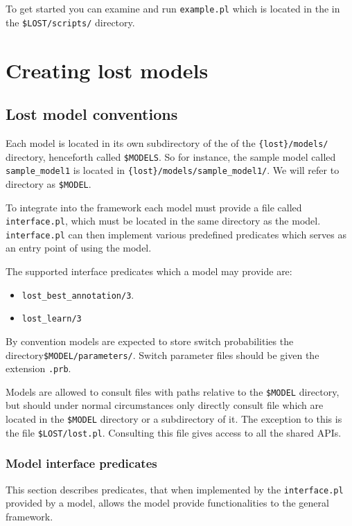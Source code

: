 \documentclass{book}
\begin{document}
To get started you can examine and run \texttt{example.pl} which 
is located in the in the \texttt{\$LOST/scripts/} directory.

\chapter{Creating lost models}

\section{Lost model conventions}\label{sec:lost_model_conventions}

Each model is located in its own subdirectory of the of the
\texttt{\{lost\}/models/} directory, henceforth called \texttt{\$MODELS}. 
So for instance, the sample model called \texttt{sample\_model1} is located in
\texttt{\{lost\}/models/sample\_model1/}. We will refer to directory 
as \texttt{\$MODEL}.

To integrate into the framework each model must provide a file called
\texttt{interface.pl}, which must be located in the same directory as
the model. \texttt{interface.pl} can then implement various predefined
predicates which serves as an entry point of using the
model. 

The supported interface predicates which a model may provide are:
\begin{itemize}
\item \texttt{lost\_best\_annotation/3}.
\item \texttt{lost\_learn/3}
\end{itemize}

By convention models are expected to store switch probabilities the
directory\texttt{\$MODEL/parameters/}. Switch parameter files should
be given the extension \texttt{.prb}.

Models are allowed to consult files with paths relative to the
\texttt{\$MODEL} directory, but should under normal circumstances
only directly consult file which are located in the 
\texttt{\$MODEL} directory or a subdirectory of it.
The exception to this is the file \texttt{\$LOST/lost.pl}. Consulting
this file gives access to all the shared APIs. 

\subsection{Model interface predicates}

This section describes predicates, that when implemented by 
the \texttt{interface.pl} provided by a model, allows the 
model provide functionalities to the  general framework.
\end{document}
